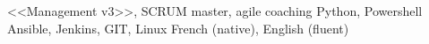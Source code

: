 \begin{cvskills}
     {<<Management v3>>, SCRUM master, agile coaching}
     {Python, Powershell}
     {Ansible, Jenkins, GIT, Linux}
     {French (native), English (fluent)}
\end{cvskills}